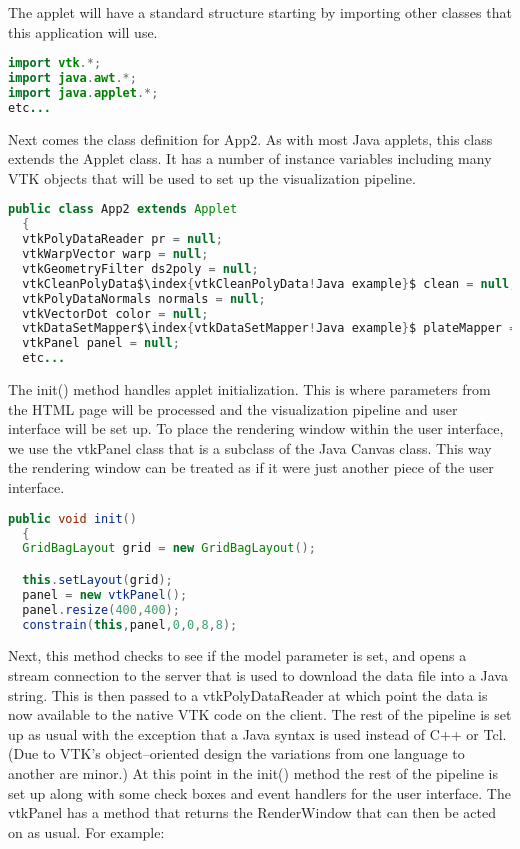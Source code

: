 The applet will have a standard structure starting by importing other classes that this application will use.

\begin{lstlisting}[language=Java, caption={}, numbers=none, frame=none]
import vtk.*;
import java.awt.*;
import java.applet.*;
etc...
\end{lstlisting}

Next comes the class definition for App2. As with most Java applets, this class extends the Applet class. It has a number of instance variables including many VTK objects that will be used to set up the visualization pipeline.

\begin{lstlisting}[language=Java, caption={}, numbers=none, frame=none, escapechar=\$]
public class App2 extends Applet
  {
  vtkPolyDataReader pr = null;
  vtkWarpVector warp = null;
  vtkGeometryFilter ds2poly = null;
  vtkCleanPolyData$\index{vtkCleanPolyData!Java example}$ clean = null;
  vtkPolyDataNormals normals = null;
  vtkVectorDot color = null;
  vtkDataSetMapper$\index{vtkDataSetMapper!Java example}$ plateMapper = null;
  vtkPanel panel = null;
  etc...
\end{lstlisting}

The init() method handles applet initialization. This is where parameters from the HTML page will be processed and the visualization pipeline and user interface will be set up. To place the rendering window within the user interface, we use the vtkPanel class that is a subclass of the Java Canvas class. This way the rendering window can be treated as if it were just another piece of the user interface.

\begin{lstlisting}[language=Java, caption={}, numbers=none, frame=none]
public void init()
  {
  GridBagLayout grid = new GridBagLayout();

  this.setLayout(grid);
  panel = new vtkPanel();
  panel.resize(400,400);
  constrain(this,panel,0,0,8,8);
\end{lstlisting}

Next, this method checks to see if the model parameter is set, and opens a stream connection to the server that is used to download the data file into a Java string. This is then passed to a vtkPolyDataReader at which point the data is now available to the native VTK code on the client. The rest of the pipeline is set up as usual with the exception that a Java syntax is used instead of C++ or Tcl. (Due to VTK's object--oriented design the variations from one language to another are minor.) At this point in the init() method the rest of the pipeline is set up along with some check boxes and event handlers for the user interface. The vtkPanel has a method that returns the RenderWindow that can then be acted on as usual. For example:

